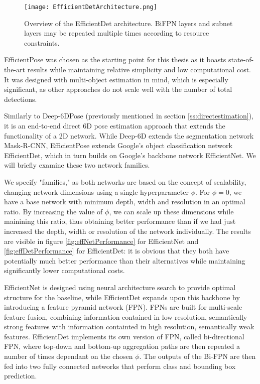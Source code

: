 \begin{figure}[ht]
    \centering
    \texttt{[image: EfficientDetArchitecture.png]}
    \caption{Overview of the EfficientDet architecture. BiFPN layers and subnet layers may be repeated multiple times according to resource constraints.}
\end{figure}

EfficientPose was chosen as the starting point for this thesis as it boasts state-of-the-art results while maintaining relative simplicity and low computational cost. It was designed with multi-object estimation in mind, which is especially significant, as other approaches do not scale well with the number of total detections.

Similarly to Deep-6DPose (previously mentioned in section \ref*{ss:directestimation}), it is an end-to-end direct 6D pose estimation approach that extends the functionality of a 2D network. While Deep-6D extends the segmentation network Mask-R-CNN, EfficientPose extends Google's object classification network EfficientDet\cite{EfficientDet}, which in turn builds on Google's backbone network EfficientNet\cite{EfficientNet}. We will briefly examine these two network families.

We specify "families," as both networks are based on the concept of scalability, changing network dimensions using a single hyperparameter $\phi$. For $\phi = 0$, we have a base network with minimum depth, width and resolution in an optimal ratio. By increasing the value of $\phi$, we can scale up these dimensions while mainining this ratio, thus obtaining better performance than if we had just increased the depth, width or resolution of the network individually. The results are visible in figure \ref{fig:effNetPerformance} for EfficientNet and \ref{fig:effDetPerformance} for EfficientDet: it is obvious that they both have potentially much better performance than their alternatives while maintaining significantly lower computational costs.

EfficientNet is designed using neural architecture search\cite{NAS} to provide optimal structure for the baseline, while EfficientDet expands upon this backbone by introducing a feature pyramid network\cite{FPN} (FPN). FPNs are built for multi-scale feature fusion, combining information contained in low resolution, semantically strong features with information containted in high resolution, semantically weak features. EfficientDet implements its own version of FPN, called bi-directional FPN, where top-down and bottom-up aggregation paths are then repeated a number of times dependant on the chosen $\phi$. The outputs of the Bi-FPN are then fed into two fully connected networks that perform class and bounding box prediction.

